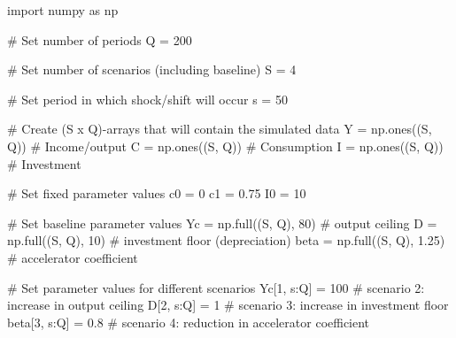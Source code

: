 \documentclass[
  letterpaper,
  DIV=11,
  numbers=noendperiod]{scrreprt}
\newenvironment{Shaded}{\begin{snugshade}}{\end{snugshade}}
\newcommand{\CommentTok}[1]{\textcolor[rgb]{0.37,0.37,0.37}{#1}}
\newcommand{\DecValTok}[1]{\textcolor[rgb]{0.68,0.00,0.00}{#1}}
\newcommand{\FloatTok}[1]{\textcolor[rgb]{0.68,0.00,0.00}{#1}}
\newcommand{\ImportTok}[1]{\textcolor[rgb]{0.00,0.46,0.62}{#1}}
\newcommand{\NormalTok}[1]{\textcolor[rgb]{0.00,0.23,0.31}{#1}}
\newcommand{\OperatorTok}[1]{\textcolor[rgb]{0.37,0.37,0.37}{#1}}
\begin{document}
\begin{tcolorbox}[enhanced jigsaw, titlerule=0mm, breakable, bottomrule=.15mm, toprule=.15mm, colbacktitle=quarto-callout-note-color!10!white, rightrule=.15mm, toptitle=1mm, opacityback=0, left=2mm, coltitle=black, title=\textcolor{quarto-callout-note-color}{\faInfo}\hspace{0.5em}{Python code}, colframe=quarto-callout-note-color-frame, opacitybacktitle=0.6, leftrule=.75mm, bottomtitle=1mm, arc=.35mm, colback=white]

\begin{Shaded}
\begin{Highlighting}[]
\ImportTok{import}\NormalTok{ numpy }\ImportTok{as}\NormalTok{ np}

\CommentTok{\# Set number of periods}
\NormalTok{Q }\OperatorTok{=} \DecValTok{200}

\CommentTok{\# Set number of scenarios (including baseline)}
\NormalTok{S }\OperatorTok{=} \DecValTok{4}

\CommentTok{\# Set period in which shock/shift will occur}
\NormalTok{s }\OperatorTok{=} \DecValTok{50}

\CommentTok{\# Create (S x Q){-}arrays that will contain the simulated data}
\NormalTok{Y }\OperatorTok{=}\NormalTok{ np.ones((S, Q))  }\CommentTok{\# Income/output}
\NormalTok{C }\OperatorTok{=}\NormalTok{ np.ones((S, Q))  }\CommentTok{\# Consumption}
\NormalTok{I }\OperatorTok{=}\NormalTok{ np.ones((S, Q))  }\CommentTok{\# Investment}

\CommentTok{\# Set fixed parameter values}
\NormalTok{c0 }\OperatorTok{=} \DecValTok{0}
\NormalTok{c1 }\OperatorTok{=} \FloatTok{0.75}
\NormalTok{I0 }\OperatorTok{=} \DecValTok{10}

\CommentTok{\# Set baseline parameter values}
\NormalTok{Yc }\OperatorTok{=}\NormalTok{ np.full((S, Q), }\DecValTok{80}\NormalTok{)      }\CommentTok{\# output ceiling}
\NormalTok{D }\OperatorTok{=}\NormalTok{ np.full((S, Q), }\DecValTok{10}\NormalTok{)       }\CommentTok{\# investment floor (depreciation)}
\NormalTok{beta }\OperatorTok{=}\NormalTok{ np.full((S, Q), }\FloatTok{1.25}\NormalTok{)  }\CommentTok{\# accelerator coefficient}

\CommentTok{\# Set parameter values for different scenarios}
\NormalTok{Yc[}\DecValTok{1}\NormalTok{, s:Q] }\OperatorTok{=} \DecValTok{100}     \CommentTok{\# scenario 2: increase in output ceiling}
\NormalTok{D[}\DecValTok{2}\NormalTok{, s:Q] }\OperatorTok{=} \DecValTok{1}        \CommentTok{\# scenario 3: increase in investment floor}
\NormalTok{beta[}\DecValTok{3}\NormalTok{, s:Q] }\OperatorTok{=} \FloatTok{0.8}   \CommentTok{\# scenario 4: reduction in accelerator coefficient}


\end{Highlighting}
\end{Shaded}
\end{tcolorbox}
\end{document}

